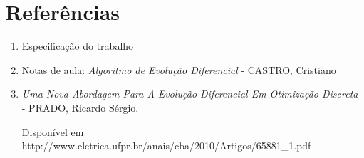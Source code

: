 \documentclass[12pt]{elsarticle}
\begin{document}
	\section{Referências}
	\begin{enumerate}
		\item Especificação do trabalho
		\item Notas de aula: \textit{Algoritmo de Evolução Diferencial} - CASTRO, Cristiano
		\item \textit{Uma Nova Abordagem Para A Evolução Diferencial Em Otimização Discreta} - PRADO, Ricardo Sérgio.
		
		Disponível em http://www.eletrica.ufpr.br/anais/cba/2010/Artigos/65881\_1.pdf
	\end{enumerate}
	
\end{document}

